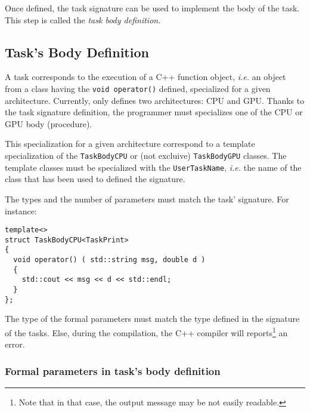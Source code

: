 Once defined, the task signature can be used to implement the body of the task. This step is called the \textit{task body definition}.

\subsection{Task's Body Definition}
A task corresponds to the execution of a C++ function object,
{\it i.e.} an object from a class having the \verb!void operator()!
defined, specialized for a given architecture.
Currently, \kaapi only defines two architectures: CPU and GPU.
Thanks to the task signature definition, the programmer must 
specializes one of the CPU or GPU body (procedure).

This specialization for a given architecture correspond to a template 
specialization of the \verb+TaskBodyCPU+ or (not excluive) \verb+TaskBodyGPU+ classes.
The template classes must be specialized with the \verb+UserTaskName+, \textit{i.e.} the name of the class that has been used to defined the signature.

The types and the number of parameters must match the task' signature.
For instance:
\begin{center}
\begin{boxit}
\begin{verbatim}
template<>
struct TaskBodyCPU<TaskPrint> 
{
  void operator() ( std::string msg, double d )
  {
    std::cout << msg << d << std::endl;
  }
};
\end{verbatim}
\end{boxit}
\end{center}
The type of  the formal parameters must match the type defined in the signature of the tasks. 
Else, during the compilation, the C++ compiler will reports\footnote{Note that in that case, the output message may be not easily readable.} an error.


\subsubsection{Formal parameters in task's body definition}

